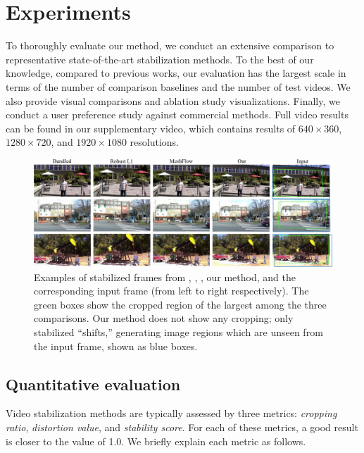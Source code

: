 \section{Experiments}
To thoroughly evaluate our method, we conduct an extensive comparison to representative state-of-the-art stabilization methods.
To the best of our knowledge, compared to previous works, our evaluation has the largest scale in terms of the number of comparison baselines and the number of test videos.
We also provide visual comparisons and ablation study visualizations.
Finally, we conduct a user preference study against commercial methods.
Full video results can be found in our supplementary video, which contains results of $640\times360$, $1280\times720$, and $1920\times1080$ resolutions.

\begin{figure}
	\includegraphics[width=1\linewidth,keepaspectratio]{crop}
	\caption{Examples of stabilized frames from \cite{liu2013bundled}, \cite{grundmann2011auto}, \cite{liu2016meshflow}, our method, and the corresponding input frame (from left to right respectively). The green boxes show the cropped region of the largest among the three comparisons. Our method does not show any cropping; only stabilized ``shifts,'' generating image regions which are unseen from the input frame, shown as blue boxes.}
	\label{crop}
	\vspace{-2mm}
\end{figure}

\subsection{Quantitative evaluation}
Video stabilization methods are typically assessed by three metrics: \emph{cropping ratio}, \emph{distortion value}, and \emph{stability score}.
For each of these metrics, a good result is closer to the value of 1.0.
We briefly explain each metric as follows.

